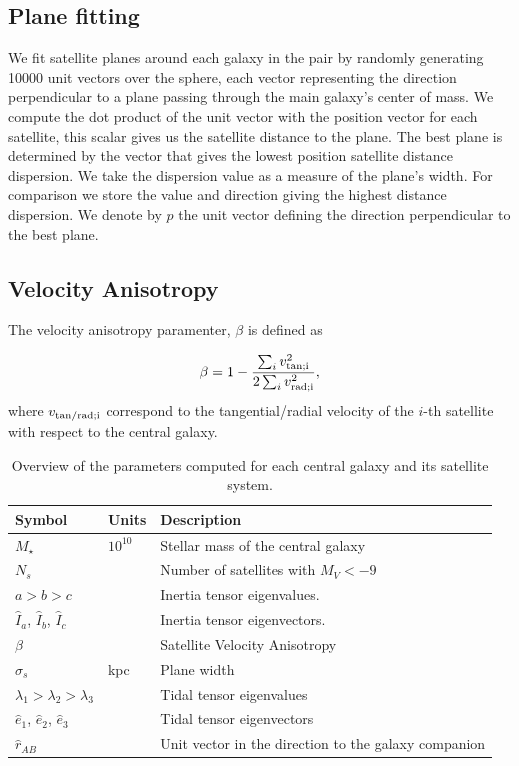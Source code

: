\documentclass[useAMS,usenatbib,usegraphicx]{mn2e}
\newcommand{\Msun}{{\ifmmode{{\rm{M_{\odot}}}}\else{${\rm{M_{\odot}}}$}\fi}}
\begin{document}

\subsection{Plane fitting}
\label{sub:planes}

We fit satellite planes around each galaxy in the pair by randomly
generating 10000 unit vectors over the  sphere, each vector
representing the direction perpendicular to a plane passing through
the main galaxy's center of mass. 
We compute the dot product of the unit vector with the position vector
for each satellite, this scalar gives us the satellite distance to the
plane. 
The best plane is determined by the vector that gives the lowest
position satellite distance dispersion. 
We take the dispersion value as a measure of the plane's width.
For comparison we store the value and direction giving the
highest distance dispersion.
We denote by $\hat{p}$ the unit vector defining the direction
perpendicular to the best plane.


\subsection{Velocity Anisotropy}
\label{sub:beta}

The velocity anisotropy paramenter, $\beta$ is defined as

\begin{equation}
  \beta = 1 - \frac{\sum_i v^2_{\rm{tan}; i}}{2\sum_i v^{2}_{\rm{rad};i}},
\label{eq:beta}
\end{equation}
% 
where $v_{\rm{tan/rad};i}$ correspond to the tangential/radial
velocity of the $i$-th satellite with respect to the central galaxy.



\begin{table}
  \centering
\begin{tabular}{lll}
\hline\hline
Symbol & Units & Description\\\hline
$M_{\star}$ & $10^{10}$\Msun & Stellar mass of the central galaxy\\
$N_s$ & & Number of satellites with $M_V<-9$\\
$a > b> c$ & & Inertia tensor eigenvalues. \\
$\hat{I}_a$, $\hat{I}_b$, $\hat{I}_c$ & & Inertia tensor eigenvectors. \\
$\beta$  &  & Satellite Velocity Anisotropy\\
$\sigma_s$ & kpc & Plane width\\
$\lambda_1>\lambda_2>\lambda_3$ &  & Tidal tensor
eigenvalues\\
$\hat{e}_{1}$,  $\hat{e}_{2}$,  $\hat{e}_{3}$ &  & Tidal tensor
eigenvectors\\ 
$\hat{r}_{AB}$& & Unit vector in the direction to the galaxy companion\\
\hline\hline
\end{tabular}
  \caption{Overview of the parameters computed for each central galaxy
    and its satellite system.
  \label{tab:models}}
\end{table}
\end{document}
